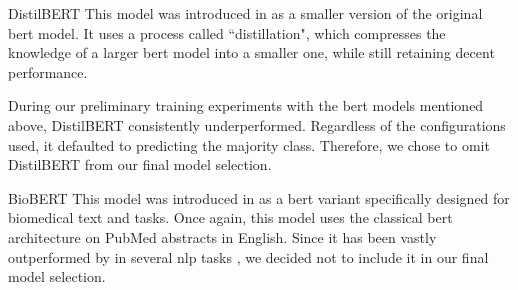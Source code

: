 \begin{paragraph}{DistilBERT}
    This model was introduced in
     as a smaller version of the original \gls{bert} model. It uses a process called ``distillation", which compresses the knowledge of a larger \gls{bert} model into a smaller one, while still retaining decent performance. 

    During our preliminary training experiments with the \gls{bert} models mentioned above, DistilBERT consistently underperformed. Regardless of the configurations used, it defaulted to predicting the majority class. Therefore, we chose to omit DistilBERT from our final model selection.

\end{paragraph}


\begin{paragraph}{BioBERT}
    This model was introduced in  as a \gls{bert} variant specifically designed for biomedical text and tasks. Once again, this model uses the classical \gls{bert} architecture on PubMed abstracts in English. Since it has been vastly outperformed by \bertbiolinkbert{} in several \gls{nlp} tasks , we decided not to include it in our final model selection.
\end{paragraph}



